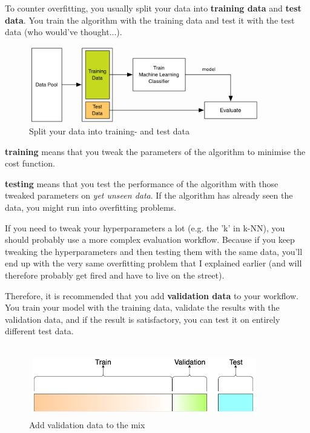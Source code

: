 \documentclass[11pt]{article}
\begin{document}
To counter overfitting, you usually split your data into \textbf{training data} and \textbf{test data}. You train the algorithm with the training data and test it with the test data (who would've thought...).

\begin{figure}[htb!]
    \centering
    \includegraphics[keepaspectratio=true,width=0.9\textwidth]{training_testdata.png}
    \caption{Split your data into training- and test data}
    \label{fig:training_testdata}
\end{figure}

\textbf{training} means that you tweak the parameters of the algorithm to minimise the cost function.

\textbf{testing} means that you test the performance of the algorithm with those tweaked parameters on \textit{yet unseen data}. If the algorithm has already seen the data, you might run into overfitting problems.

\vspace{10px}

If you need to tweak your hyperparameters a lot (e.g. the 'k' in k-NN), you should probably use a more complex evaluation workflow. Because if you keep tweaking the hyperparameters and then testing them with the same data, you'll end up with the very same overfitting problem that I explained earlier (and will therefore probably get fired and have to live on the street).

\vspace{10px}

Therefore, it is recommended that you add \textbf{validation data} to your workflow. You train your model with the training data, validate the results with the validation data, and if the result is satisfactory, you can test it on entirely different test data.

\begin{figure}[htb!]
    \centering
    \includegraphics[keepaspectratio=true,width=0.9\textwidth]{validation_data.png}
    \caption{Add validation data to the mix}
    \label{fig:validation_data}
\end{figure}
\end{document}
